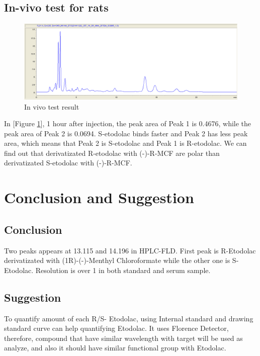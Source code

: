 \documentclass[12pt]{article} %
\begin{document}
\subsection {In-vivo test for rats}

\begin{figure}[h!]
  \centering
  \includegraphics[width=\linewidth]{f9.png}
  \caption{In vivo test result}
  \label{fig:fig8}
\end{figure}

 In [Figure \ref{fig:fig8}],  1 hour after injection, the peak area of Peak 1 is 0.4676, while the peak area of Peak 2 is 0.0694. S-etodolac binds faster\cite{cite2} and Peak 2 has less peak area, which means that Peak 2 is S-etodolac and Peak 1 is R-etodolac. We can find out that derivatizated R-etodolac with (-)-R-MCF are polar than derivatizated S-etodolac with (-)-R-MCF.

\newpage

\section {Conclusion and Suggestion}

\subsection {Conclusion}
Two peaks appears at 13.115 and 14.196 in HPLC-FLD. First peak is R-Etodolac derivatizated with (1R)-(-)-Menthyl Chloroformate while the other one is S-Etodolac. Resolution is over 1 in both standard and serum sample.  

\subsection {Suggestion}
  To quantify amount of each R/S- Etodolac, using Internal standard and drawing standard curve can help quantifying Etodolac. It uses Florence Detector, therefore, compound that have similar wavelength with target will be used as analyze, and also it should have similar functional group with Etodolac.
\end{document}
